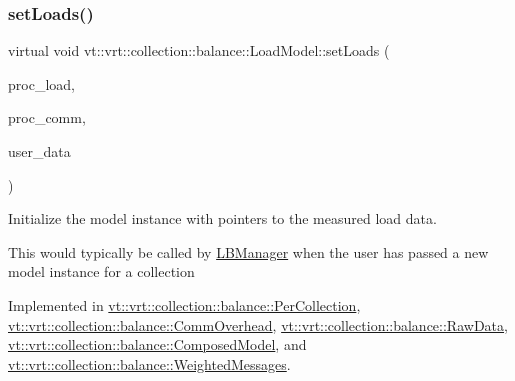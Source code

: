 \subsubsection{\texorpdfstring{set\+Loads()}{setLoads()}}
{\footnotesize\ttfamily virtual void vt\+::vrt\+::collection\+::balance\+::\+Load\+Model\+::set\+Loads (\begin{DoxyParamCaption}\item[{std\+::unordered\+\_\+map$<$ \hyperlink{namespacevt_a46ce6733d5cdbd735d561b7b4029f6d7}{Phase\+Type}, \hyperlink{namespacevt_1_1vrt_1_1collection_1_1balance_a5339303db2e1ce964d783a53fd74e6b1}{Load\+Map\+Type} $>$ const $\ast$}]{proc\+\_\+load,  }\item[{std\+::unordered\+\_\+map$<$ \hyperlink{namespacevt_a46ce6733d5cdbd735d561b7b4029f6d7}{Phase\+Type}, \hyperlink{namespacevt_1_1vrt_1_1collection_1_1balance_a01ee1fb0ae2da1d2ab7fdca3be9ae351}{Comm\+Map\+Type} $>$ const $\ast$}]{proc\+\_\+comm,  }\item[{std\+::unordered\+\_\+map$<$ \hyperlink{namespacevt_a46ce6733d5cdbd735d561b7b4029f6d7}{Phase\+Type}, \hyperlink{namespacevt_1_1vrt_1_1collection_1_1balance_acf152c668ed9e2e9c6b29784181d2435}{Data\+Map\+Type} $>$ const $\ast$}]{user\+\_\+data }\end{DoxyParamCaption})\hspace{0.3cm}{\ttfamily [pure virtual]}}



Initialize the model instance with pointers to the measured load data. 

This would typically be called by \hyperlink{structvt_1_1vrt_1_1collection_1_1balance_1_1_l_b_manager}{L\+B\+Manager} when the user has passed a new model instance for a collection 

Implemented in \hyperlink{structvt_1_1vrt_1_1collection_1_1balance_1_1_per_collection_a9158b31a385b34a0109cac3bc0e281a6}{vt\+::vrt\+::collection\+::balance\+::\+Per\+Collection}, \hyperlink{structvt_1_1vrt_1_1collection_1_1balance_1_1_comm_overhead_ae7a19ba064de7bd6e87d4682cfe1f4c3}{vt\+::vrt\+::collection\+::balance\+::\+Comm\+Overhead}, \hyperlink{structvt_1_1vrt_1_1collection_1_1balance_1_1_raw_data_a001085a70865991909ae14e3b5561bb1}{vt\+::vrt\+::collection\+::balance\+::\+Raw\+Data}, \hyperlink{classvt_1_1vrt_1_1collection_1_1balance_1_1_composed_model_a0c4e07b352c1e8cbb8383d26361437e5}{vt\+::vrt\+::collection\+::balance\+::\+Composed\+Model}, and \hyperlink{structvt_1_1vrt_1_1collection_1_1balance_1_1_weighted_messages_aced294a1e3e528a3c6b00051ed2258eb}{vt\+::vrt\+::collection\+::balance\+::\+Weighted\+Messages}.

